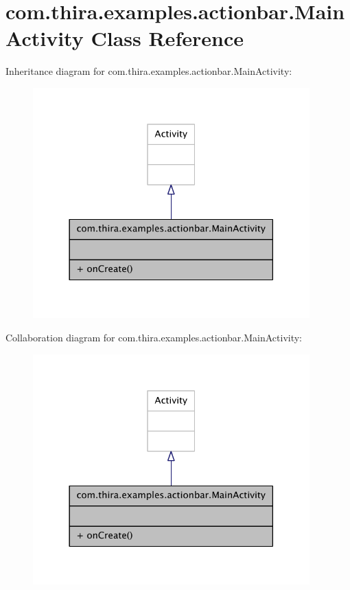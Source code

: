 \hypertarget{classcom_1_1thira_1_1examples_1_1actionbar_1_1_main_activity}{\section{com.\-thira.\-examples.\-actionbar.\-Main\-Activity Class Reference}
\label{classcom_1_1thira_1_1examples_1_1actionbar_1_1_main_activity}
}


Inheritance diagram for com.\-thira.\-examples.\-actionbar.\-Main\-Activity\-:
\nopagebreak
\begin{figure}[H]
\begin{center}
\leavevmode
\includegraphics[width=302pt]{classcom_1_1thira_1_1examples_1_1actionbar_1_1_main_activity__inherit__graph}
\end{center}
\end{figure}


Collaboration diagram for com.\-thira.\-examples.\-actionbar.\-Main\-Activity\-:
\nopagebreak
\begin{figure}[H]
\begin{center}
\leavevmode
\includegraphics[width=302pt]{classcom_1_1thira_1_1examples_1_1actionbar_1_1_main_activity__coll__graph}
\end{center}
\end{figure}
